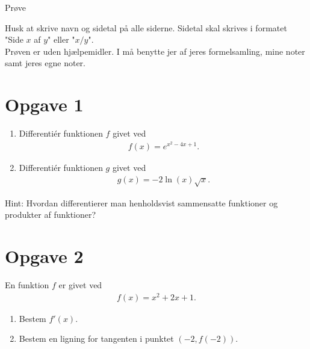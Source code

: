 
\begin{center}
\Huge
Prøve
\end{center}
\begin{center}
Husk at skrive navn og sidetal på alle siderne. Sidetal skal skrives i formatet "Side $x$ af $y$" eller "$x/y$".\\
Prøven er uden hjælpemidler. I må benytte jer af jeres formelsamling, mine noter samt jeres egne noter.
\end{center}

\section*{Opgave 1}
\begin{enumerate}[label=\roman*)]
\item Differentiér funktionen $f$ givet ved
\begin{align*}
f(x) = e^{x^2-4x+1}.
\end{align*}
\item Differentiér funktionen $g$ givet ved
\begin{align*}
g(x) = -2\ln(x)\sqrt{x}.
\end{align*}
\end{enumerate}
Hint: Hvordan differentierer man henholdsvist sammensatte funktioner og produkter af funktioner?
\section*{Opgave 2}
En funktion $f$ er givet ved 
\begin{align*}
f(x) = x^2+2x+1.
\end{align*}
\begin{enumerate}[label=\roman*)]
\item Bestem $f'(x)$.
\item Bestem en ligning for tangenten i punktet $(-2,f(-2))$.
\end{enumerate}
